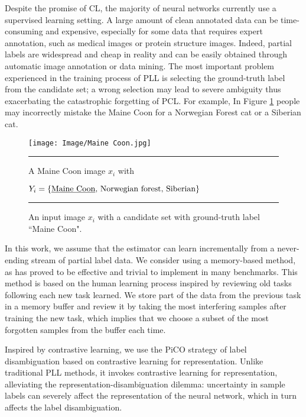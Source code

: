 \documentclass{article} %
\begin{document}
Despite the promise of CL, the majority of neural networks currently use a supervised learning setting. 
A large amount of clean annotated data can be time-consuming and expensive, especially for some data that requires expert annotation, such as medical images or protein structure images.
Indeed, partial labels are widespread and cheap in reality and can be easily obtained through automatic image annotation\citep{ChingHuiChen2017LearningFA} or data mining\citep{JieLuo2010LearningFC}. 
The most important problem experienced in the training process of PLL is selecting the ground-truth label from the candidate set; a wrong selection may lead to severe ambiguity thus exacerbating the catastrophic forgetting of PCL.
For example, In Figure \ref{maine} people may incorrectly mistake the Maine Coon for a Norwegian Forest cat or a Siberian cat.
\begin{figure}[h]
    \setlength{\abovecaptionskip}{-1.cm}
    \setlength{\belowcaptionskip}{-0.4cm}
    \begin{center}
    \texttt{[image: Image/Maine Coon.jpg]}
    \begin{spacing}{0.25}

    \rule[0.3cm]{3in}{0.05em}
    \end{spacing}
    A Maine Coon image $x_i$ with

    $Y_i = \{ \text{\underline{Maine Coon}, Norwegian forest, Siberian} \}$

    \rule[1cm]{3in}{0.05em}
    \end{center}
    \caption{An input image $x_i$ with a candidate set with ground-truth label ``Maine Coon".}
    \label{maine}
\end{figure}

In this work, we assume that the estimator can learn incrementally from a never-ending stream of partial label data. We consider using a memory-based method, as has proved to be effective and trivial to implement in many benchmarks. 
This method is based on the human learning process inspired by reviewing old tasks following each new task learned\citep{DavidRolnick2018ExperienceRF}.
We store part of the data from the previous task in a memory buffer and review it by taking the most interfering samples after training the new task, which implies that we choose a subset of the most forgotten samples from the buffer each time\citep{MIR}.

Inspired by contrastive learning, we use the PiCO strategy of label disambiguation based on contrastive learning for representation\citep{HaoboWang2022PiCOCL, KaimingHe2019MomentumCF}.
Unlike traditional PLL methods, it invokes contrastive learning for representation, alleviating the representation-disambiguation dilemma: uncertainty in sample labels can severely affect the representation of the neural network, which in turn affects the label disambiguation\citep{HaoboWang2022PiCOCL}.
\end{document}
